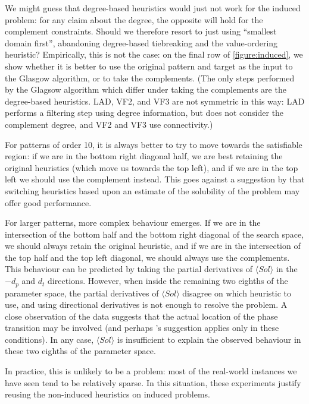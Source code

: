 \documentclass[twoside,11pt]{article}
\begin{document}
We might guess that degree-based heuristics would just not work for the induced problem: for any
claim about the degree, the opposite will hold for the complement constraints. Should we therefore
resort to just using ``smallest domain first'', abandoning degree-based tiebreaking and the
value-ordering heuristic? Empirically, this is not the case: on the final row of
\cref{figure:induced}, we show whether it is better to use the original pattern and target as the
input to the Glasgow algorithm, or to take the complements.  (The only steps performed by the
Glagsow algorithm which differ under taking the complements are the degree-based heuristics.  LAD,
VF2, and VF3 are not symmetric in this way: LAD performs a filtering step using degree information,
but does not consider the complement degree, and VF2 and VF3 use connectivity.)

For patterns of order 10, it is always better to try to move towards the satisfiable region: if we
are in the bottom right diagonal half, we are best retaining the original heuristics (which move us
towards the top left), and if we are in the top left we should use the complement instead. This
goes against a suggestion by  that switching heuristics based upon an estimate of
the solubility of the problem may offer good performance.

For larger patterns, more complex behaviour emerges. If we are in the intersection of the bottom half
and the bottom right diagonal of the search space, we should always retain the original heuristic,
and if we are in the intersection of the top half and the top left diagonal, we should always use
the complements. This behaviour can be predicted by taking the partial derivatives of $\langle Sol
\rangle$ in the $-d_p$ and $d_t$ directions.  However, when inside the remaining two eighths of the
parameter space, the partial derivatives of $\langle Sol \rangle$ disagree on which heuristic to
use, and using directional derivatives is not enough to resolve the problem. A close observation of
the data suggests that the actual location of the phase transition may be involved (and perhaps
\citeauthor{DBLP:conf/aaai/Walsh98}'s suggestion applies only in these conditions). In any case, $\langle Sol
\rangle$ is insufficient to explain the observed behaviour in these two eighths of the parameter space.

In practice, this is unlikely to be a problem: most of the real-world instances we have seen tend to
be relatively sparse. In this situation, these experiments justify reusing the non-induced
heuristics on induced problems.
\end{document}
